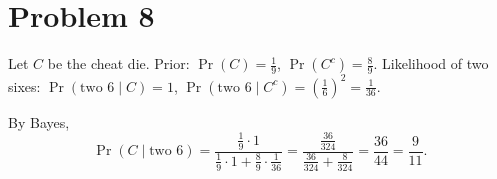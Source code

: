\section*{Problem 8}

Let \(C\) be the cheat die. Prior: \(\Pr(C)=\tfrac19\), \(\Pr(C^c)=\tfrac89\).
Likelihood of two sixes: \(\Pr(\text{two 6}\mid C)=1\), \(\Pr(\text{two 6}\mid C^c)=(\tfrac16)^2=\tfrac1{36}\).

By Bayes,
\[
\Pr(C\mid \text{two 6})=\frac{\frac19\cdot 1}{\frac19\cdot 1+\frac89\cdot \frac1{36}}
=\frac{\frac{36}{324}}{\frac{36}{324}+\frac{8}{324}}=\frac{36}{44}=\frac{9}{11}.
\]

